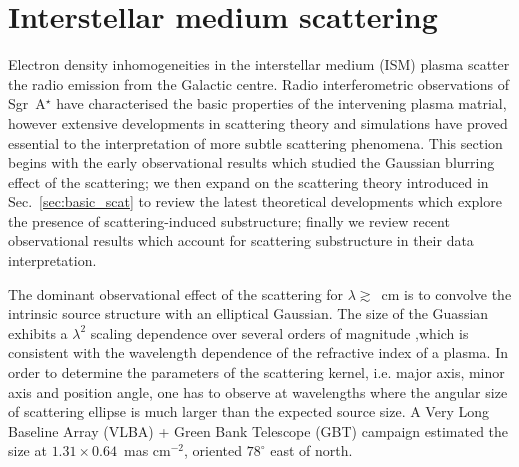 \section{Interstellar medium scattering}

Electron density inhomogeneities in the interstellar medium (ISM) plasma scatter the radio emission from the Galactic centre. Radio interferometric observations of Sgr~A$^\star$ have characterised the basic properties of the intervening plasma matrial, however extensive developments in scattering theory and simulations have proved essential to the interpretation of more subtle scattering phenomena. This section begins with the early observational results which studied the Gaussian blurring effect of the scattering; we then expand on the scattering theory introduced in Sec.~\ref{sec:basic_scat} to review the latest theoretical developments which explore the presence of scattering-induced substructure; finally we review recent observational results which account for scattering substructure in their data interpretation. 


The dominant observational effect of the scattering for $\lambda \gtrsim$~cm is to convolve the intrinsic source structure with an elliptical Gaussian. The size of the Guassian exhibits a $\lambda^2$ scaling dependence over several orders of magnitude \citep[Fig.~\ref{fig:scattering_law}][]{Backer_1978, Shen_2005, Bower_2006, Lu_2011},which is consistent with the wavelength dependence of the refractive index of a plasma. In order to determine the parameters of the scattering kernel, i.e. major axis, minor axis and position angle,  one has to observe at wavelengths where the angular size of scattering ellipse is much larger than the expected source size. A Very Long Baseline Array (VLBA) + Green Bank Telescope (GBT) campaign \cite{Bower_2006} estimated the size at $1.31 \times 0.64$~mas cm$^{-2}$, oriented $78^\circ$ east of north. 


